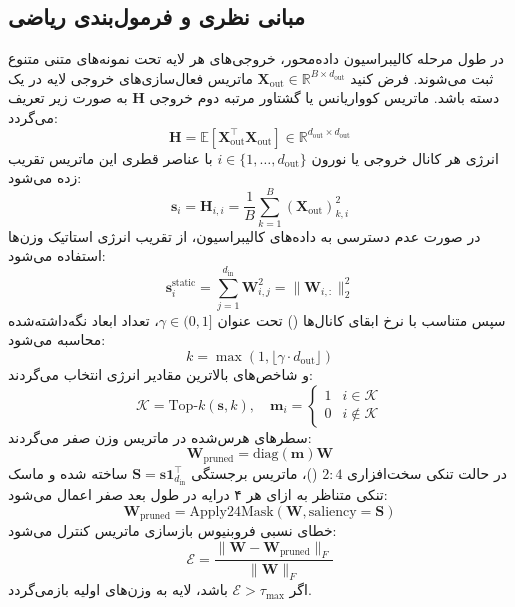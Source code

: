 \subsection{مبانی نظری و فرمول‌بندی ریاضی}
در طول مرحله کالیبراسیون داده‌محور، خروجی‌های هر لایه تحت نمونه‌های متنی متنوع ثبت می‌شوند. فرض کنید $\mathbf{X}_{\text{out}} \in \mathbb{R}^{B \times d_{\text{out}}}$ ماتریس فعال‌سازی‌های خروجی لایه در یک دسته باشد. ماتریس کوواریانس یا گشتاور مرتبه دوم خروجی $\mathbf{H}$ به صورت زیر تعریف می‌گردد:
\begin{equation}
\mathbf{H} = \mathbb{E}\left[\mathbf{X}_{\text{out}}^\top \mathbf{X}_{\text{out}}\right] \in \mathbb{R}^{d_{\text{out}} \times d_{\text{out}}}
\end{equation}
انرژی هر کانال خروجی یا نورون $i \in \{1, \dots, d_{\text{out}}\}$ با عناصر قطری این ماتریس تقریب زده می‌شود:
\begin{equation}
\mathbf{s}_i = \mathbf{H}_{i, i} = \frac{1}{B} \sum_{k=1}^B (\mathbf{X}_{\text{out}})_{k, i}^2
\end{equation}
در صورت عدم دسترسی به داده‌های کالیبراسیون، از تقریب انرژی استاتیک وزن‌ها استفاده می‌شود:
\begin{equation}
\mathbf{s}_i^{\text{static}} = \sum_{j=1}^{d_{\text{in}}} \mathbf{W}_{i, j}^2 = \|\mathbf{W}_{i, :}\|_2^2
\end{equation}
سپس متناسب با نرخ ابقای کانال‌ها () تحت عنوان $\gamma \in (0, 1]$، تعداد ابعاد نگه‌داشته‌شده محاسبه می‌شود:
\begin{equation}
k = \max(1, \lfloor \gamma \cdot d_{\text{out}} \rfloor)
\end{equation}
و شاخص‌های بالاترین مقادیر انرژی انتخاب می‌گردند:
\begin{equation}
\mathcal{K} = \text{Top-}k(\mathbf{s}, k), \quad \mathbf{m}_i = \begin{cases} 1 & i \in \mathcal{K} \\ 0 & i \notin \mathcal{K} \end{cases}
\end{equation}
سطرهای هرس‌شده در ماتریس وزن صفر می‌گردند:
\begin{equation}
\mathbf{W}_{\text{pruned}} = \text{diag}(\mathbf{m}) \mathbf{W}
\end{equation}
در حالت تنکی سخت‌افزاری $2:4$ ()، ماتریس برجستگی $\mathbf{S} = \mathbf{s} \mathbf{1}_{d_{\text{in}}}^\top$ ساخته شده و ماسک تنکی متناظر به ازای هر ۴ درایه در طول بعد صفر اعمال می‌شود:
\begin{equation}
\mathbf{W}_{\text{pruned}} = \text{Apply24Mask}(\mathbf{W}, \text{saliency}=\mathbf{S})
\end{equation}
خطای نسبی فروبنیوس بازسازی ماتریس کنترل می‌شود:
\begin{equation}
\mathcal{E} = \frac{\|\mathbf{W} - \mathbf{W}_{\text{pruned}}\|_F}{\|\mathbf{W}\|_F}
\end{equation}
اگر $\mathcal{E} > \tau_{\text{max}}$ باشد، لایه به وزن‌های اولیه بازمی‌گردد.

